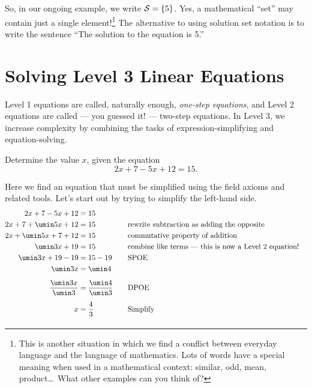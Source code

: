 So, in our ongoing example, we write $\mathcal{S}=\left\{5\right\}$. Yes, a mathematical ``set'' may contain just a single element!\footnote{This is another situation in which we find a conflict between everyday language and the language of mathematics. Lots of words have a special meaning when used in a mathematical context: similar, odd, mean, product\ldots\ What other examples can you think of?} The alternative to using solution set notation is to write the sentence ``The solution to the equation is 5.''


\section{Solving Level 3 Linear Equations}
\label{sec:linearlevel3}

Level 1 equations are called, naturally enough, \textit{one-step equations}, and Level 2 equations are called --- you guessed it! --- two-step equations. In Level 3, we increase complexity by combining the tasks of expression-simplifying and equation-solving.

\begin{boxedexplore}
\end{boxedexplore}

\begin{boxedexplore}
Determine the value $x$, given the equation \[2x + 7 - 5x + 12 = 15.\]
\end{boxedexplore} %

Here we find an equation that must be simplified using the field axioms and related tools. Let's start out by trying to simplify the left-hand side.
\[\begin{aligned}
2x + 7 - 5x + 12 & = 15\\
2x + 7 + \umin5x + 12 & = 15
&&\text{\quad rewrite subtraction as adding the opposite}\\
2x + \umin5x + 7 + 12 & = 15
&&\text{\quad commutative property of addition}\\
\umin3x + 19 & = 15
&&\text{\quad combine like terms --- this is now a Level 2 equation!}\\
\umin3x + 19 - 19 & = 15 - 19
&&\text{\quad SPOE}\\
\umin3x & = \umin4
&&\text{}\\[1ex]
\frac{\umin3x}{\umin3} & = \frac{\umin4}{\umin3}
&&\text{\quad DPOE}\\[1ex]
x & = \frac{4}{3}
&&\text{\quad Simplify}\\[1ex]
\end{aligned}\]

